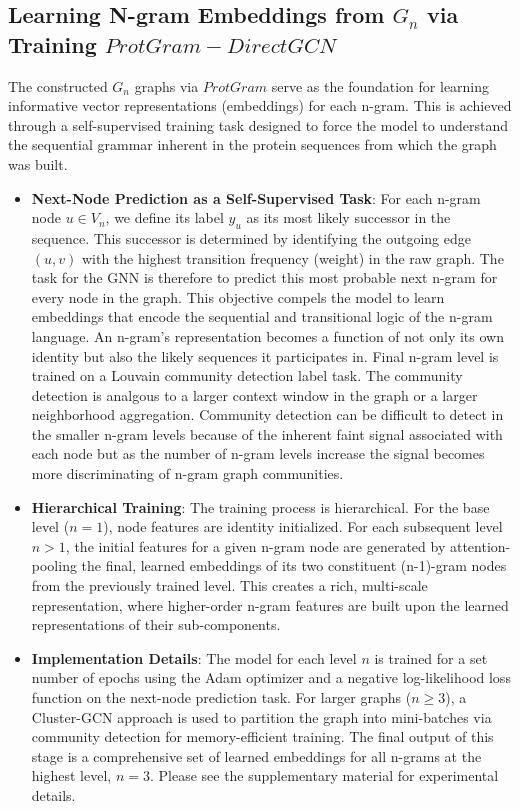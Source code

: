\documentclass[utf8]{FrontiersinHarvard}
\begin{document}
	\subsection{Learning N-gram Embeddings from $G_{n}$ via Training $ProtGram-DirectGCN$}
	The constructed $G_{n}$ graphs via $ProtGram$ serve as the foundation for learning informative vector representations (embeddings) for each n-gram. This is achieved through a self-supervised training task designed to force the model to understand the sequential grammar inherent in the protein sequences from which the graph was built.
	\begin{itemize}
		\item \textbf{Next-Node Prediction as a Self-Supervised Task}: For each n-gram node $u \in V_n$, we define its label $y_u$ as its most likely successor in the sequence. This successor is determined by identifying the outgoing edge $(u,v)$ with the highest transition frequency (weight) in the raw graph. The task for the GNN is therefore to predict this most probable next n-gram for every node in the graph. This objective compels the model to learn embeddings that encode the sequential and transitional logic of the n-gram language. An n-gram's representation becomes a function of not only its own identity but also the likely sequences it participates in. Final n-gram level is trained on a Louvain community detection \cite{blondel_fastunfoldingcommunities_2008} label task. The community detection is analgous to a larger context window in the graph or a larger neighborhood aggregation. Community detection can be difficult to detect in the smaller n-gram levels because of the inherent faint signal associated with each node but as the number of n-gram levels increase the signal becomes more discriminating of n-gram graph communities. 
		
		\item \textbf{Hierarchical Training}: The training process is hierarchical. For the base level ($n=1$), node features are identity initialized. For each subsequent level $n > 1$, the initial features for a given n-gram node are generated by attention-pooling the final, learned embeddings of its two constituent (n-1)-gram nodes from the previously trained level. This creates a rich, multi-scale representation, where higher-order n-gram features are built upon the learned representations of their sub-components.
		
		\item \textbf{Implementation Details}: The model for each level $n$ is trained for a set number of epochs using the Adam optimizer and a negative log-likelihood loss function on the next-node prediction task. For larger graphs ($n \geq 3$), a Cluster-GCN \cite{chiang_clustergcnefficientalgorithm_2019} approach is used to partition the graph into mini-batches via community detection for memory-efficient training. The final output of this stage is a comprehensive set of learned embeddings for all n-grams at the highest level, $n=3$. Please see the supplementary material for experimental details.
	\end{itemize}
	
\end{document}
